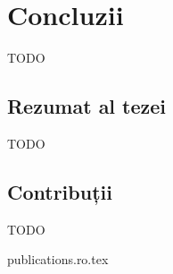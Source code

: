 \chapter{Concluzii}
\label{conclusion:chapter}

TODO

\section{Rezumat al tezei}

TODO

\section{Contribuții}

TODO

{publications.ro.tex}

